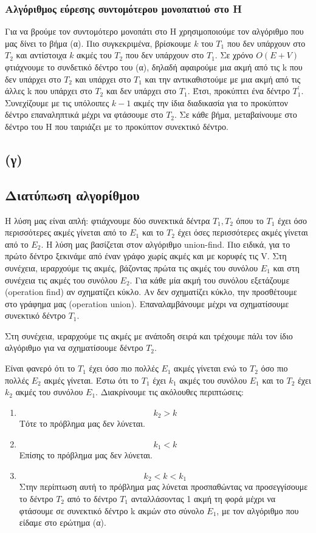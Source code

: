 \documentclass[a4paper,oneside, 11pt]{article}
\begin{document}
\subsubsection{Αλγόριθμος εύρεσης συντομότερου μονοπατιού στο H}
Για να βρούμε τον συντομότερο μονοπάτι στο H χρησιμοποιούμε τον αλγόριθμο που μας δίνει το βήμα (α). Πιο συγκεκριμένα, βρίσκουμε $k$ του $T_1$ που δεν υπάρχουν στο $T_2$ και αντίστοιχα $k$ ακμές του $T_2$ που δεν υπάρχουν στο $T_1$. Σε χρόνο $O(E+V)$ φτιάχνουμε το συνδετικό δέντρο του (α), δηλαδή αφαιρούμε μια ακμή από τις k που δεν υπάρχει στο $T_2$ και υπάρχει στο $T_1$ και την αντικαθιστούμε με μια ακμή από τις άλλες k που υπάρχει στο $T_2$ και δεν υπάρχει στο $T_1$. Έτσι, προκύπτει ένα δέντρο $T_1^{'}$. Συνεχίζουμε με τις υπόλοιπες $k-1$ ακμές την ίδια διαδικασία για το προκύπτον δέντρο επαναληπτικά μέχρι να φτάσουμε στο $T_2$. Σε κάθε βήμα, μεταβαίνουμε στο δέντρο του H που ταιριάζει με το προκύπτον συνεκτικό δέντρο.


\subsection{(γ)}
\subsection{Διατύπωση αλγορίθμου}
Η λύση μας είναι απλή: φτιάχνουμε δύο συνεκτικά δέντρα $T_1, T_2$   όπου το $T_1$ έχει όσο περισσότερες ακμές γίνεται από το $E_1$ και το $T_2$ έχει όσες περισσότερες ακμές γίνεται από το $E_2$.
Η λύση μας βασίζεται στον αλγόριθμο union-find. \bigbreak Πιο ειδικά, για το πρώτο δέντρο ξεκινάμε από έναν γράφο χωρίς ακμές και με κορυφές τις V. Στη συνέχεια, ιεραρχούμε τις ακμές, βάζοντας πρώτα τις ακμές του συνόλου $E_1$ και στη συνέχεια τις ακμές του συνόλου $E_2$. Για κάθε μία ακμή του συνόλου εξετάζουμε (operation find) αν σχηματίζει κύκλο. Αν δεν σχηματίζει κύκλο, την προσθέτουμε στο γράφημα μας (operation union). Επαναλαμβάνουμε μέχρι να σχηματίσουμε συνεκτικό δέντρο $T_1$. \bigbreak 

Στη συνέχεια, ιεραρχούμε τις ακμές με ανάποδη σειρά και τρέχουμε πάλι τον ίδιο αλγόριθμο για να σχηματίσουμε δέντρο $T_2$. \bigbreak

Είναι φανερό ότι το $T_1$ έχει όσο πιο πολλές $E_1$ ακμές γίνεται ενώ το $T_2$ όσο πιο πολλές $E_2$ ακμές γίνεται. Έστω ότι το $T_1$ έχει $k_1$ ακμές του συνόλου $E_1$ και το $T_2$ έχει $k_2$ ακμές του συνόλου $E_1$. Διακρίνουμε τις ακόλουθες περιπτώσεις:
\begin{enumerate}
\item 
$$k_2 > k$$
Τότε το πρόβλημα μας δεν λύνεται.
\item 
$$k_1 < k$$
Επίσης το πρόβλημα μας δεν λύνεται.
\item 
$$k_2 < k < k_1$$
Στην περίπτωση αυτή το πρόβλημα μας λύνεται προσπαθώντας να προσεγγίσουμε το δέντρο $T_2$ από το δέντρο $T_1$ ανταλλάσοντας 1 ακμή τη φορά μέχρι να φτάσουμε σε συνεκτικό δέντρο k ακμών στο σύνολο $E_1$, με τον αλγόριθμο που είδαμε στο ερώτημα (α).
\end{enumerate} 
\end{document}

